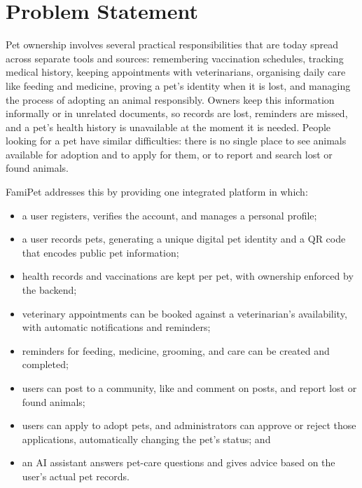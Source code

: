 
\section{Problem Statement}

Pet ownership involves several practical responsibilities that are today spread
across separate tools and sources: remembering vaccination schedules, tracking
medical history, keeping appointments with veterinarians, organising daily care
like feeding and medicine, proving a pet's identity when it is lost, and managing
the process of adopting an animal responsibly. Owners keep this information
informally or in unrelated documents, so records are lost, reminders are missed,
and a pet's health history is unavailable at the moment it is needed. People
looking for a pet have similar difficulties: there is no single place to see
animals available for adoption and to apply for them, or to report and search
lost or found animals.

FamiPet addresses this by providing one integrated platform in which:

\begin{itemize}
    \item a user registers, verifies the account, and manages a personal profile;
    \item a user records pets, generating a unique digital pet identity and a QR
    code that encodes public pet information;
    \item health records and vaccinations are kept per pet, with ownership
    enforced by the backend;
    \item veterinary appointments can be booked against a veterinarian's
    availability, with automatic notifications and reminders;
    \item reminders for feeding, medicine, grooming, and care can be created and
    completed;
    \item users can post to a community, like and comment on posts, and report
    lost or found animals;
    \item users can apply to adopt pets, and administrators can approve or reject
    those applications, automatically changing the pet's status; and
    \item an AI assistant answers pet-care questions and gives advice based on
    the user's actual pet records.
\end{itemize}

